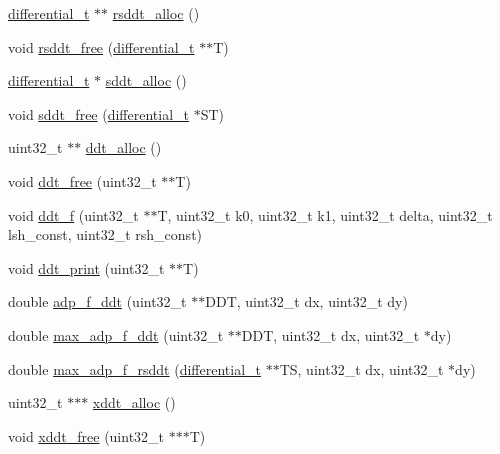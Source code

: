 \begin{DoxyCompactItemize}
\item 
\hyperlink{structdifferential__t}{differential\-\_\-t} $\ast$$\ast$ \hyperlink{adp-tea-f-fk-ddt_8cc_a9b33673043159fc8155fd759672a27b0}{rsddt\-\_\-alloc} ()
\item 
void \hyperlink{adp-tea-f-fk-ddt_8cc_a12b44b7012a0e2d3f1760784e6f8a482}{rsddt\-\_\-free} (\hyperlink{structdifferential__t}{differential\-\_\-t} $\ast$$\ast$\-T)
\item 
\hyperlink{structdifferential__t}{differential\-\_\-t} $\ast$ \hyperlink{adp-tea-f-fk-ddt_8cc_a0395ec92dbc818f2b8779389392ec023}{sddt\-\_\-alloc} ()
\item 
void \hyperlink{adp-tea-f-fk-ddt_8cc_a38f85fc23a1e6bf662e3359513451826}{sddt\-\_\-free} (\hyperlink{structdifferential__t}{differential\-\_\-t} $\ast$\-S\-T)
\item 
uint32\-\_\-t $\ast$$\ast$ \hyperlink{adp-tea-f-fk-ddt_8cc_a700c0928ef26a9130e4309c8b603792c}{ddt\-\_\-alloc} ()
\item 
void \hyperlink{adp-tea-f-fk-ddt_8cc_a0cfc92867fc1d471847ec25a48bcfb8d}{ddt\-\_\-free} (uint32\-\_\-t $\ast$$\ast$\-T)
\item 
void \hyperlink{adp-tea-f-fk-ddt_8cc_af2b10deffd82820ece2d258c915c8a90}{ddt\-\_\-f} (uint32\-\_\-t $\ast$$\ast$\-T, uint32\-\_\-t k0, uint32\-\_\-t k1, uint32\-\_\-t delta, uint32\-\_\-t lsh\-\_\-const, uint32\-\_\-t rsh\-\_\-const)
\item 
void \hyperlink{adp-tea-f-fk-ddt_8cc_ae45c4755238695992a8343a7a5fe4e95}{ddt\-\_\-print} (uint32\-\_\-t $\ast$$\ast$\-T)
\item 
double \hyperlink{adp-tea-f-fk-ddt_8cc_af181e4e9f3fbd475e728cd1789d533f1}{adp\-\_\-f\-\_\-ddt} (uint32\-\_\-t $\ast$$\ast$\-D\-D\-T, uint32\-\_\-t dx, uint32\-\_\-t dy)
\item 
double \hyperlink{adp-tea-f-fk-ddt_8cc_af1fceea05ff2c63817e865a7e3b458fa}{max\-\_\-adp\-\_\-f\-\_\-ddt} (uint32\-\_\-t $\ast$$\ast$\-D\-D\-T, uint32\-\_\-t dx, uint32\-\_\-t $\ast$dy)
\item 
double \hyperlink{adp-tea-f-fk-ddt_8cc_a417cfc278c155913968b66d613570aec}{max\-\_\-adp\-\_\-f\-\_\-rsddt} (\hyperlink{structdifferential__t}{differential\-\_\-t} $\ast$$\ast$\-T\-S, uint32\-\_\-t dx, uint32\-\_\-t $\ast$dy)
\item 
uint32\-\_\-t $\ast$$\ast$$\ast$ \hyperlink{adp-tea-f-fk-ddt_8cc_a0396966a9a11ad40f31edafc85db591f}{xddt\-\_\-alloc} ()
\item 
void \hyperlink{adp-tea-f-fk-ddt_8cc_a114fedd486da22fbe4e4da1cd0c7ed17}{xddt\-\_\-free} (uint32\-\_\-t $\ast$$\ast$$\ast$\-T)
$$
\end{DoxyCompactItemize}
